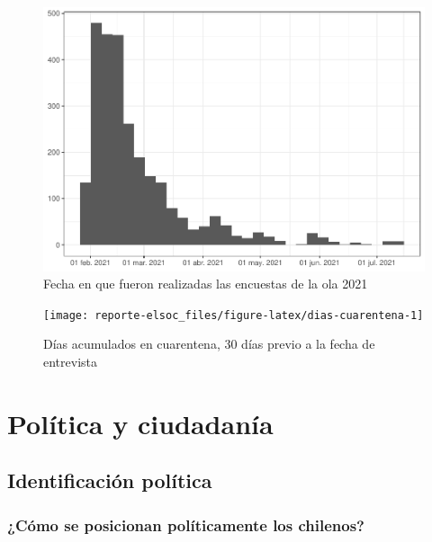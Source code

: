 \documentclass[
  12pt,
]{book}
\begin{document}
\begin{figure}

{\centering \includegraphics{reporte-elsoc_files/figure-latex/hist-fecha-2021-1} 

}

\caption{Fecha en que fueron realizadas las encuestas de la ola 2021}\label{fig:hist-fecha-2021}
\end{figure}

\begin{figure}

{\centering \texttt{[image: reporte-elsoc\_files/figure-latex/dias-cuarentena-1]} 

}

\caption{Días acumulados en cuarentena, 30 días previo a la fecha de entrevista}\label{fig:dias-cuarentena}
\end{figure}

\hypertarget{poluxedtica-y-ciudadanuxeda}{%
\chapter{Política y ciudadanía}\label{poluxedtica-y-ciudadanuxeda}}

\hypertarget{identificaciuxf3n-poluxedtica}{%
\section{Identificación política}\label{identificaciuxf3n-poluxedtica}}

\hypertarget{cuxf3mo-se-posicionan-poluxedticamente-los-chilenos}{%
\subsection*{¿Cómo se posicionan políticamente los chilenos?}\label{cuxf3mo-se-posicionan-poluxedticamente-los-chilenos}}
\end{document}
